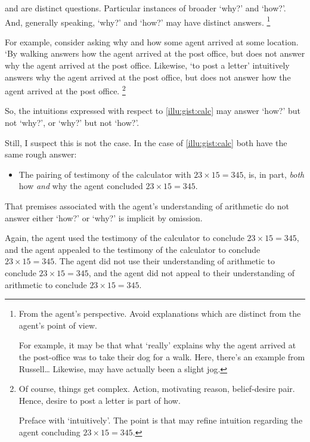 \begin{note}
  \qWhy{} and \qHow{} are distinct questions.
  Particular instances of broader `why?' and `how?'.
  And, generally speaking, `why?' and `how?' may have distinct answers.%
  \footnote{
    From the agent's perspective.
    Avoid explanations which are distinct from the agent's point of view.

    For example, it may be that what `really' explains why the agent arrived at the post-office was to take their dog for a walk.
    {
      \color{red}
      Here, there's an example from Russell\dots
    }
    Likewise, may have actually been a slight jog.
  }

  For example, consider asking why and how some agent arrived at some location.
  `By walking answers how the agent arrived at the post office, but does not answer why the agent arrived at the post office.
  Likewise, `to post a letter' intuitively answers why the agent arrived at the post office, but does not answer how the agent arrived at the post office.%
  \footnote{
    Of course, things get complex.
    Action, motivating reason, belief-desire pair.
    Hence, desire to post a letter is part of how.

    Preface with `intuitively'.
    The point is that may refine intuition regarding the agent concluding \(23 \times 15 = 345\).
  }

  So, the intuitions expressed with respect to \autoref{illu:gist:calc} may answer `how?' but not `why?', or `why?' but not `how?'.

  Still, I suspect this is not the case.
  In the case of \autoref{illu:gist:calc} both have the same rough answer:

  \begin{itemize}
  \item
    The pairing of testimony of the calculator with \(23 \times 15 = 345\), is, in part, \emph{both} how \emph{and} why the agent concluded \(23 \times 15 = 345\).
  \end{itemize}
  That premises associated with the agent's understanding of arithmetic do not answer either `how?' or `why?' is implicit by omission.

  Again, the agent used the testimony of the calculator to conclude \(23 \times 15 = 345\), and the agent appealed to the testimony of the calculator to conclude \(23 \times 15 = 345\).
  The agent did not use their understanding of arithmetic to conclude \(23 \times 15 = 345\), and the agent did not appeal to their understanding of arithmetic to conclude \(23 \times 15 = 345\).
\end{note}

